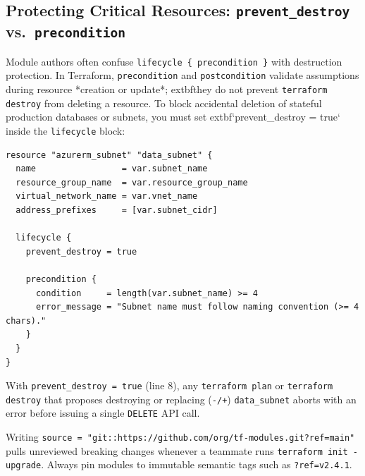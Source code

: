 \subsection{Protecting Critical Resources: \texttt{prevent\_destroy} vs.\ \texttt{precondition}}
Module authors often confuse \texttt{lifecycle \{ precondition \}} with destruction protection. In Terraform, \texttt{precondition} and \texttt{postcondition} validate assumptions during resource *creation or update*; 	extbf{they do not prevent \texttt{terraform destroy} from deleting a resource}. To block accidental deletion of stateful production databases or subnets, you must set 	extbf{`prevent\_destroy = true`} inside the \texttt{lifecycle} block:

\begin{lstlisting}[language=hcl, caption={Guarding a Production Subnet with \texttt{prevent\_destroy} and \texttt{precondition}}]
resource "azurerm_subnet" "data_subnet" {
  name                 = var.subnet_name
  resource_group_name  = var.resource_group_name
  virtual_network_name = var.vnet_name
  address_prefixes     = [var.subnet_cidr]

  lifecycle {
    prevent_destroy = true

    precondition {
      condition     = length(var.subnet_name) >= 4
      error_message = "Subnet name must follow naming convention (>= 4 chars)."
    }
  }
}
\end{lstlisting}

With \texttt{prevent\_destroy = true} (line 8), any \texttt{terraform plan} or \texttt{terraform destroy} that proposes destroying or replacing (\texttt{-/+}) \texttt{data\_subnet} aborts with an error before issuing a single \texttt{DELETE} API call.

\begin{commonmistakebox}
Writing \texttt{source = "git::https://github.com/org/tf-modules.git?ref=main"} pulls unreviewed breaking changes whenever a teammate runs \texttt{terraform init -upgrade}. Always pin modules to immutable semantic tags such as \texttt{?ref=v2.4.1}.
\end{commonmistakebox}

